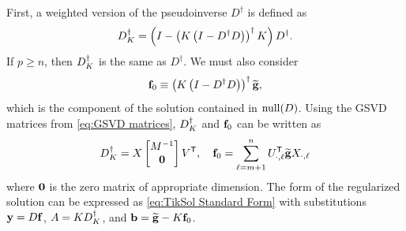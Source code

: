 First, a weighted version of the pseudoinverse $D^\dagger$ is defined as
\[D_{K}^\dagger = \left(I - \left(K\left(I - D^\dagger D\right)\right)^\dagger K\right)D^\dagger.\]
If $p \geq n$, then $D_{K}^\dagger$ is the same as $D^\dagger$. We must also consider
\[\mathbf{f}_0 \equiv \left(K\left(I - D^\dagger D\right)\right)^\dagger \widetilde{\mathbf{g}},\]
which is the component of the solution contained in $\operatorname{null}(D)$.  Using the GSVD matrices from \eqref{eq:GSVD matrices}, $D_{K}^\dagger$ and $\mathbf{f}_0$ can be written as
\begin{equation}
\label{eq:Trans. 1}
D_{K}^\dagger = X \begin{bmatrix}
M^{-1} \\
\mathbf{0}
\end{bmatrix}{V}^\mathsf{T}, \quad \mathbf{f}_0 = \sum_{\ell=m+1}^{n} {U}^\mathsf{T}_{\cdot,\ell}\widetilde{\mathbf{g}} X_{\cdot,\ell}
\end{equation}
where $\boldsymbol{0}$ is the zero matrix of appropriate dimension. The form of the regularized solution can be expressed as \eqref{eq:TikSol Standard Form} with substitutions $\mathbf{y} = D\mathbf{f}$, $A = K{D_{K}^\dagger}$, and $\mathbf{b} = \widetilde{\mathbf{g}} - K\mathbf{f}_0$. 
